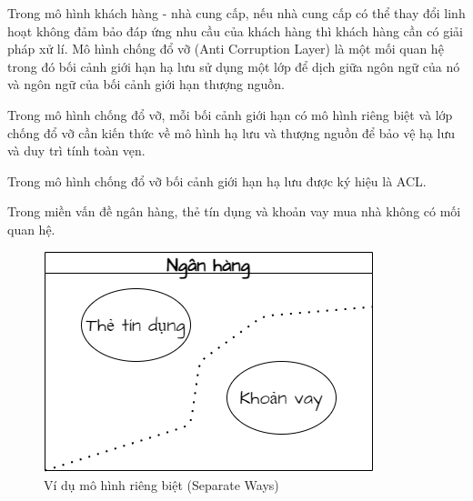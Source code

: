 




Trong mô hình khách hàng - nhà cung cấp, nếu nhà cung cấp có thể thay đổi  linh hoạt không đảm bảo đáp ứng nhu cầu của    khách hàng    thì     khách hàng    cần có giải pháp xử lí.     Mô hình chống đổ vỡ (Anti Corruption Layer)  là một mối quan hệ trong đó bối cảnh giới hạn hạ lưu   sử dụng một lớp để dịch giữa ngôn ngữ của   nó và ngôn ngữ của   bối cảnh giới hạn thượng nguồn.   

Trong mô hình  chống đổ vỡ, mỗi     bối cảnh giới hạn  có mô hình riêng biệt và lớp chống đổ vỡ cần kiến thức về   mô hình    hạ lưu     và thượng nguồn để bảo vệ    hạ lưu  và duy trì tính toàn vẹn. 

Trong mô hình  chống đổ vỡ      bối cảnh giới hạn hạ lưu  được ký hiệu là  ACL.



\begin{example} Trong miền vấn đề ngân hàng,     thẻ tín dụng và khoản vay mua nhà không có mối quan hệ. 
    
    \begin{figure}[H]
        
        \centering
        
        \includegraphics[scale = 0.5]{pictures/mo_hinh_rieng_biet_separate_ways/main.drawio.png}
        
        \caption{Ví dụ  mô hình riêng biệt (Separate Ways)  }
        
    \end{figure}
\end{example} 
